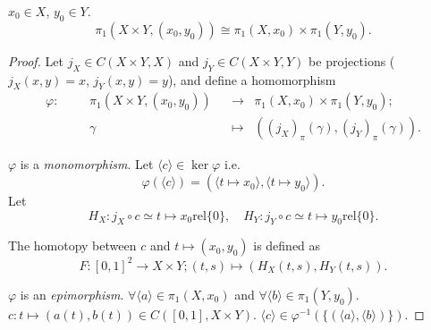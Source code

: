 \documentclass[openany, oneside, a5paper]{book}
\newcommand*{\rel}{\mathbin{\mathrm{rel}}}
\newcommand*{\pclass}[1]{\langle{#1}\rangle}    %
\begin{document}
\begin{theorem}%
    \label{theorem: Fundamental group of product space}
    $x_0 \in X$, $y_0 \in Y$.
    \begin{equation*}
        \pi_1(X \times Y, (x_0, y_0)) \cong \pi_1(X, x_0) \times \pi_1(Y, y_0).
    \end{equation*}
\end{theorem}
\begin{proof}
    Let $j_X \in C(X \times Y, X)$ and $j_Y \in C(X \times Y, Y)$ be projections ($j_X(x, y) = x$, $j_Y(x, y) = y$), and define a homomorphism
    \begin{align*}
        \varphi\colon && &\pi_1(X \times Y, (x_0, y_0)) &&\to &\pi_1(X, x_0) \times \pi_1(Y, y_0); \\
        &&&\gamma &&\mapsto &((j_X)_\pi(\gamma), (j_Y)_\pi(\gamma)).
    \end{align*}

    $\varphi$ is a \emph{monomorphism}.
    Let $\pclass{c} \in \ker \varphi$ i.e.\
    \begin{equation*}
        \varphi(\pclass{c}) = (\pclass{t \mapsto x_0}, \pclass{t \mapsto y_0}).
    \end{equation*}
    Let
    \begin{equation*}
       H_X \colon j_X \circ c \simeq  t \mapsto x_0 \rel \{0\},
       \quad
       H_Y \colon j_Y \circ c \simeq t \mapsto y_0\rel \{0\}.
    \end{equation*}

    The homotopy between $c$ and $t \mapsto (x_0, y_0)$ is defined as
    \begin{equation*}
        F \colon [0, 1]^2 \to X \times Y;
        (t, s) \mapsto (H_X(t, s), H_Y(t, s)).
    \end{equation*}

    $\varphi$ is an \emph{epimorphism}.
    $\forall \pclass{a} \in \pi_1(X, x_0)$ and $\forall \pclass{b} \in \pi_1(Y, y_0)$.
    $c\colon t \mapsto (a(t), b(t)) \in C([0, 1], X \times Y)$.
    $\pclass{c} \in \varphi^{-1}(\{(\pclass{a}, \pclass{b})\})$.
\end{proof}
\end{document}
